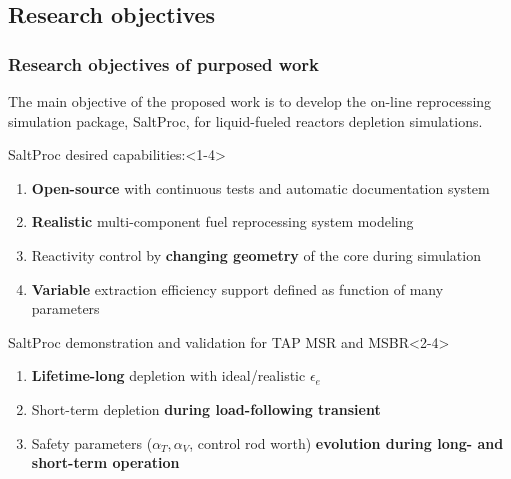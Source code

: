 \subsection{Research objectives}

\begin{frame}
  \frametitle{Research objectives of purposed work}
                  \vspace*{-0.05in}
      The main objective of the proposed work is to develop the on-line  
      reprocessing simulation package, SaltProc, for liquid-fueled reactors 
      depletion simulations.
     \begin{block}{SaltProc desired capabilities:}<1-4>
         \begin{enumerate}
                \item \textbf{Open-source} with continuous tests and 
				automatic documentation system 
                \item \textbf{Realistic} multi-component fuel 
                reprocessing system modeling
                \item Reactivity control by \textbf{changing geometry} of 
                the core during simulation
                \item \textbf{Variable} extraction efficiency support defined 
                as function of many parameters
         \end{enumerate}
      \end{block}
            \vspace{-0.1in}
	\begin{block}{SaltProc demonstration and validation for TAP MSR and 
	MSBR}<2-4>
		\begin{enumerate}
			\item<2-4> \textbf{Lifetime-long} depletion with ideal/realistic 
			$\epsilon_e$
			\item<3-4> Short-term depletion \textbf{during load-following 
			transient}
			\item<4> Safety parameters ($\alpha_{T}, \alpha_{V}$, control rod 
			worth) \textbf{evolution during long- and short-term operation}
		\end{enumerate}
	\end{block}
\end{frame}
